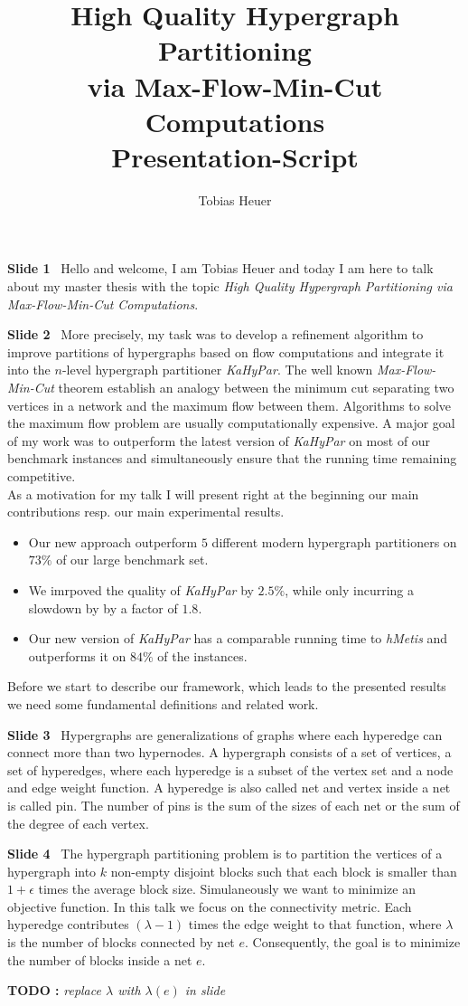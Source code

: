 \documentclass[11pt]{llncs}
\title{High Quality Hypergraph Partitioning \\ via Max-Flow-Min-Cut Computations \\ Presentation-Script }
\author{
    Tobias Heuer
}
\institute{%
Karlsruhe Institute of Technology (KIT), Karlsruhe, Germany.
}
\newcounter{todocount}
\newcommand{\todo}[1]{{\color{red}\textbf{TODO \the\value{todocount}:}
        \emph{#1} \addtocounter{todocount}{1}}}
\newcommand{\fakepar}[1]{\medskip\par\textbf{#1}\ }
\begin{document}
\maketitle

\fakepar{Slide 1} Hello and welcome, I am Tobias Heuer and today I am here to talk
about my master thesis with the topic \emph{High Quality Hypergraph Partitioning via
Max-Flow-Min-Cut Computations}.

\fakepar{Slide 2} More precisely, my task was to develop a refinement algorithm to improve
partitions of hypergraphs based on flow computations and integrate it into the $n$-level hypergraph 
partitioner \emph{KaHyPar}. The well known \emph{Max-Flow-Min-Cut} theorem establish an analogy
between the minimum cut separating two vertices in a network and the maximum flow between
them. Algorithms to solve the maximum flow problem are usually computationally expensive. 
A major goal of my work was to outperform the latest version of \emph{KaHyPar} on most
of our benchmark instances and simultaneously ensure that the running time remaining 
competitive.\\
As a motivation for my talk I will present right at the beginning our main contributions
resp. our main experimental results.
\begin{itemize}
\item Our new approach outperform $5$ different modern hypergraph partitioners on $73\%$ of our
      large benchmark set.
\item We imrpoved the quality of \emph{KaHyPar} by $2.5\%$, while only incurring a slowdown by
      by a factor of $1.8$.
\item Our new version of \emph{KaHyPar} has a comparable running time to \emph{hMetis} and outperforms
      it on $84\%$ of the instances.
\end{itemize}
Before we start to describe our framework, which leads to the presented results we need some
fundamental definitions and related work.

\fakepar{Slide 3} Hypergraphs are generalizations of graphs where each hyperedge can connect
more than two hypernodes. A hypergraph consists of a set of vertices, a set of hyperedges, where
each hyperedge is a subset of the vertex set and a node and edge weight function. A hyperedge is also
called net and vertex inside a net is called pin. The number of pins is the sum of the sizes of each
net or the sum of the degree of each vertex.

\fakepar{Slide 4} The hypergraph partitioning problem is to partition the vertices of a hypergraph
into $k$ non-empty disjoint blocks such that each block is smaller than $1 + \epsilon$ times the
average block size. Simulaneously we want to minimize an objective function. In this talk we focus
on the connectivity metric. Each hyperedge contributes $(\lambda-1)$ times the edge weight to that
function, where $\lambda$ is the number of blocks connected by net $e$. Consequently, the goal is
to minimize the number of blocks inside a net $e$.
\todo{replace $\lambda$ with $\lambda(e)$ in slide}
\end{document}
